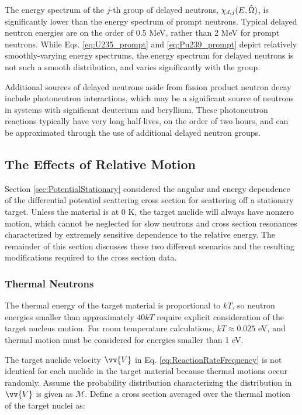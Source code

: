 The energy spectrum of the \(j\)-th group of delayed neutrons, \(\chi_{d,j}(E,\hat{\Omega})\), is significantly lower than the energy spectrum of prompt neutrons. Typical delayed neutron energies are on the order of 0.5 MeV, rather than 2 MeV for prompt neutrons. While Eqs. \eqref{eq:U235_prompt} and \eqref{eq:Pu239_prompt} depict relatively smoothly-varying energy spectrums, the energy spectrum for delayed neutrons is not such a smooth distribution, and varies significantly with the group.

Additional sources of delayed neutrons aside from fission product neutron decay include photoneutron interactions, which may be a significant source of neutrons in systems with significant deuterium and beryllium. These photoneutron reactions typically have very long half-lives, on the order of two hours, and can be approximated through the use of additional delayed neutron groups.

\subsection{The Effects of Relative Motion}
\label{sec:ThermalEffects}

Section \ref{sec:PotentialStationary} considered the angular and energy dependence of the differential potential scattering cross section for scattering off a stationary target. Unless the material is at 0 K, the target nuclide will always have nonzero motion, which cannot be neglected for slow neutrons and cross section resonances characterized by extremely sensitive dependence to the relative energy. The remainder of this section discusses these two different scenarios and the resulting modifications required to the cross section data.

\subsubsection{Thermal Neutrons}
\label{sec:ThermalNeutrons}
The thermal energy of the target material is proportional to \(kT\), so neutron energies smaller than approximately \(40kT\) require explicit consideration of the target nucleus motion. For room temperature calculations, \(kT\approx0.025\) eV, and thermal motion must be considered for energies smaller than 1 eV.

The target nuclide velocity \(\vv{V}\) in Eq. \eqref{eq:ReactionRateFrequency} is not identical for each nuclide in the target material because thermal motions occur randomly. Assume the probability distribution characterizing the distribution in \(\vv{V}\) is given as \(\mathscr{M}\). Define a cross section averaged over the thermal motion of the target nuclei as:

